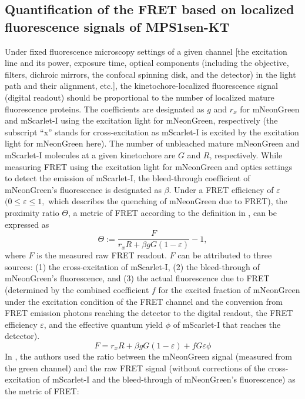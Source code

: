 \subsection{Quantification of the FRET based on localized fluorescence signals of MPS1sen-KT}
\label{FRETMetricTheory}
Under fixed fluorescence microscopy settings of a given channel [the excitation line and its power, exposure time, optical components (including the objective, filters, dichroic mirrors, the confocal spinning disk, and the detector) in the light path and their alignment, etc.], the kinetochore-localized fluorescence signal (digital readout) should be proportional to the number of localized mature fluorescence proteins. The coefficients are designated as $g$ and $r_x$ for mNeonGreen and mScarlet-I using the excitation light for mNeonGreen, respectively (the subscript ``x'' stands for cross-excitation 
as mScarlet-I is excited by the excitation light for mNeonGreen here). The number of unbleached mature mNeonGreen and mScarlet-I molecules at a given kinetochore are $G$ and $R$, respectively. While measuring FRET using the excitation light for mNeonGreen and optics settings to detect the emission of mScarlet-I, the bleed-through coefficient of mNeonGreen's fluorescence is designated as $\beta$. Under a FRET efficiency of $\varepsilon$ $(0 \leq \varepsilon \leq 1,$ which describes the quenching of mNeonGreen due to FRET), the proximity ratio $\Theta$, a metric of FRET according to the definition in \cite{HeLaFRETGUI}, can be expressed as
\begin{equation*}
    \Theta := \dfrac{F}{r_xR + \beta gG(1 - \varepsilon)} - 1,
\end{equation*}
where $F$ is the measured raw FRET readout. $F$ can be attributed to three sources: (1) the cross-excitation of mScarlet-I, (2) the bleed-through of mNeonGreen's fluorescence, and (3) the actual fluorescence due to FRET (determined by the combined coefficient $f$ for the excited fraction of mNeonGreen under the excitation condition of the FRET channel and the conversion from FRET emission photons reaching the detector to the digital readout, the FRET efficiency $\varepsilon$, and the effective quantum yield $\phi$ of mScarlet-I that reaches the detector).
\begin{equation*}
    F = r_xR + \beta gG(1 - \varepsilon) + fG\varepsilon\phi
\end{equation*}
In \cite{MPS1senor}, the authors used the ratio between the mNeonGreen signal (measured from the green channel) and the raw FRET signal (without corrections of the cross-excitation of mScarlet-I and the bleed-through of mNeonGreen's fluorescence) as the metric of FRET:
